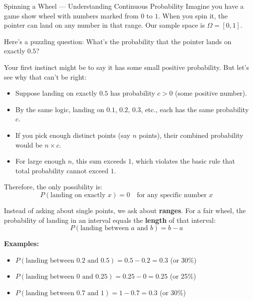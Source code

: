 \begin{exampleboxbreak}{Spinning a Wheel — Understanding Continuous Probability}
Imagine you have a game show wheel with numbers marked from $0$ to $1$. When you spin it, the pointer can land on any number in that range. Our sample space is $\Omega = [0,1]$.


Here's a puzzling question: What's the probability that the pointer lands on exactly $0.5$?

Your first instinct might be to say it has some small positive probability. But let's see why that can't be right:
\begin{itemize}
    \item Suppose landing on exactly $0.5$ has probability $c > 0$ (some positive number).
    \item By the same logic, landing on $0.1$, $0.2$, $0.3$, etc., each has the same probability $c$.
    \item If you pick enough distinct points (say $n$ points), their combined probability would be $n \times c$.
    \item For large enough $n$, this sum exceeds $1$, which violates the basic rule that total probability cannot exceed $1$.
\end{itemize}

Therefore, the only possibility is:
\[
P(\text{landing on exactly } x) = 0 \quad \text{for any specific number } x
\]


Instead of asking about single points, we ask about \textbf{ranges}. For a fair wheel, the probability of landing in an interval equals the \textbf{length} of that interval:
\[
P(\text{landing between } a \text{ and } b) = b - a
\]

\textbf{Examples:}
\begin{itemize}
    \item $P(\text{landing between } 0.2 \text{ and } 0.5) = 0.5 - 0.2 = 0.3$ (or 30\%)
    \item $P(\text{landing between } 0 \text{ and } 0.25) = 0.25 - 0 = 0.25$ (or 25\%)
    \item $P(\text{landing between } 0.7 \text{ and } 1) = 1 - 0.7 = 0.3$ (or 30\%)
\end{itemize}



\end{exampleboxbreak}
